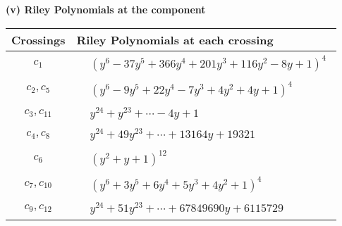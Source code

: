 \documentclass[1p]{elsarticle_modified}
\theoremstyle{definition}
\begin{document}
\flushleft \textbf{(v) Riley Polynomials at the component}\newline \\
\begin{tabular}{m{50pt}|m{274pt}}
Crossings & \hspace{64pt}Riley Polynomials at each crossing \\
\hline $$\begin{aligned}c_{1}\end{aligned}$$&$\begin{aligned}
&(y^6-37 y^5+366 y^4+201 y^3+116 y^2-8 y+1)^4
\end{aligned}$\\
\hline $$\begin{aligned}c_{2},c_{5}\end{aligned}$$&$\begin{aligned}
&(y^6-9 y^5+22 y^4-7 y^3+4 y^2+4 y+1)^4
\end{aligned}$\\
\hline $$\begin{aligned}c_{3},c_{11}\end{aligned}$$&$\begin{aligned}
&y^{24}+y^{23}+\cdots-4 y+1
\end{aligned}$\\
\hline $$\begin{aligned}c_{4},c_{8}\end{aligned}$$&$\begin{aligned}
&y^{24}+49 y^{23}+\cdots+13164 y+19321
\end{aligned}$\\
\hline $$\begin{aligned}c_{6}\end{aligned}$$&$\begin{aligned}
&(y^2+y+1)^{12}
\end{aligned}$\\
\hline $$\begin{aligned}c_{7},c_{10}\end{aligned}$$&$\begin{aligned}
&(y^6+3 y^5+6 y^4+5 y^3+4 y^2+1)^4
\end{aligned}$\\
\hline $$\begin{aligned}c_{9},c_{12}\end{aligned}$$&$\begin{aligned}
&y^{24}+51 y^{23}+\cdots+67849690 y+6115729
\end{aligned}$\\
\hline
\end{tabular}\\~\\
\end{document}

